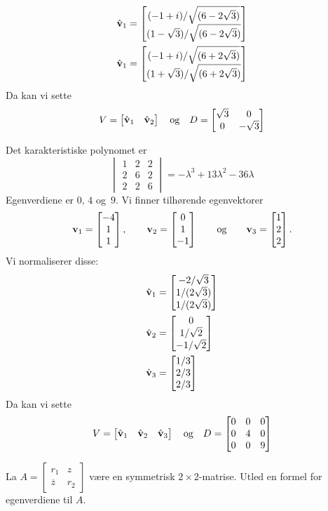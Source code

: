 \begin{losning}
\begin{punkt}
\begin{align*}
\hat{\mathbf{v}}_1
&= \begin{bmatrix} (-1+i)/\sqrt{(6-2\sqrt{3})} \\ (1-\sqrt{3})/\sqrt{(6-2\sqrt{3})} \end{bmatrix}
\\
\hat{\mathbf{v}}_1
&= \begin{bmatrix} (-1+i)/\sqrt{(6+2\sqrt{3})} \\ (1+\sqrt{3})/\sqrt{(6+2\sqrt{3})} \end{bmatrix}
\end{align*}
Da kan vi sette
\[
V = \begin{bmatrix} \hat{\mathbf{v}}_1 & \hat{\mathbf{v}}_2 \end{bmatrix}
\quad\text{og}\quad
D =
\begin{bmatrix}
\sqrt{3} & 0         \\
0        & -\sqrt{3}
\end{bmatrix}
\]
\end{punkt}
\begin{punkt}
Det karakteristiske polynomet er
\[
\begin{vmatrix}
1 & 2 & 2\\
2 & 6 & 2\\
2 & 2 & 6
\end{vmatrix}
= -\lambda^3 + 13\lambda^2 - 36\lambda
\]
Egenverdiene er $0$, $4$ og~$9$.  Vi finner tilhørende egenvektorer
\[
\mathbf{v}_1 = \begin{bmatrix} -4 \\ 1 \\ 1 \end{bmatrix},\qquad
\mathbf{v}_2 = \begin{bmatrix} 0 \\ 1 \\ -1 \end{bmatrix}\qquad\text{og}\qquad
\mathbf{v}_3 = \begin{bmatrix} 1 \\ 2 \\ 2 \end{bmatrix}.
\]
Vi normaliserer disse:
\begin{align*}
\hat{\mathbf{v}}_1 &= \begin{bmatrix} -2/\sqrt{3} \\ 1/(2\sqrt{3}) \\ 1/(2\sqrt{3}) \end{bmatrix} \\
\hat{\mathbf{v}}_2 &= \begin{bmatrix} 0 \\ 1/\sqrt{2} \\ -1/\sqrt{2} \end{bmatrix} \\
\hat{\mathbf{v}}_3 &= \begin{bmatrix} 1/3 \\ 2/3 \\ 2/3 \end{bmatrix}
\end{align*}
Da kan vi sette
\[
V = \begin{bmatrix} \hat{\mathbf{v}}_1 & \hat{\mathbf{v}}_2 & \hat{\mathbf{v}}_3 \end{bmatrix}
\quad\text{og}\quad
D =
\begin{bmatrix}
0 & 0 & 0 \\
0 & 4 & 0 \\
0 & 0 & 9
\end{bmatrix}
\]
\end{punkt}
\end{losning}


\begin{oppgave}
La $A=\begin{bmatrix}
r_1 & z\\
\overline{z} & r_2
\end{bmatrix}$ være en symmetrisk $2 \times 2$-matrise. Utled en formel for egenverdiene til $A$.
\end{oppgave}


